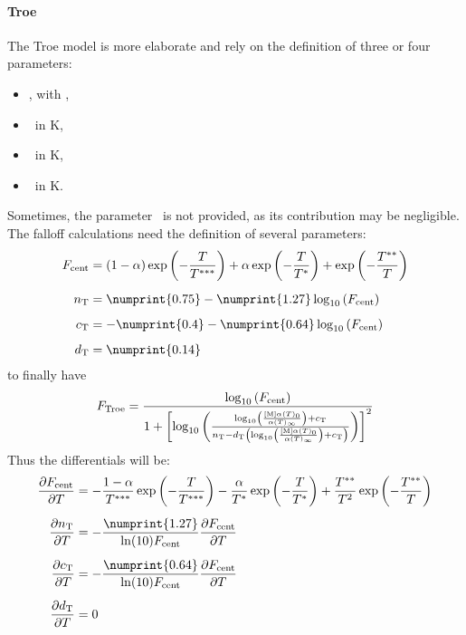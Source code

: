 \paragraph{Troe}
The Troe model is more elaborate and rely on the definition of three or
four parameters:
\begin{itemize}
\item \Troealpha, with \nounit,
\item \TroeTone\ in \unit{K},
\item \TroeTtwo\ in \unit{K},
\item \TroeTthree\ in \unit{K}.
\end{itemize}
Sometimes, the parameter \TroeTtwo\ is not provided, as its contribution
may be negligible.
The falloff calculations need the definition of several parameters:
\begin{equation}
\begin{split}
\TroeFcent & = \left(1 - \Troealpha\right)\exp\left(-\frac{\Temp}{\TroeTthree}\right)
              +          \Troealpha       \exp\left(-\frac{\Temp}{\TroeTone}\right)
              +                           \exp\left(-\frac{\TroeTtwo}{\Temp}\right) \\[5pt]
\Troen     & =   \numprint{0.75} - \numprint{1.27}\log_{10}\left(\TroeFcent\right)  \\[5pt]
\Troec     & = - \numprint{0.4}  - \numprint{0.64}\log_{10}\left(\TroeFcent\right)  \\[5pt]
\Troed     & =   \numprint{0.14}
\end{split}
\label{Troe:parameter}
\end{equation}
to finally have
\newcommand{\pr}{\ensuremath{\log_{10}\left(\frac{\conc[M]\kinMod_0}{\kinMod_\infty}\right)}}
\begin{equation}
\FTroe = \frac{\log_{10}\left(\TroeFcent\right)}
              {1 + \left[
                        \log_{10}\left(
                                        \frac{\pr + \Troec}
                                             {\Troen - \Troed\left(
                                                                \pr + \Troec
                                                            \right)}
                                 \right) 
                   \right]^2}
\label{Troe:F}
\end{equation}
Thus the differentials will be:
\begin{equation}
\begin{split}
\doverdT{\TroeFcent} & = - \frac{1 - \Troealpha}{\TroeTthree}\exp\left(-\frac{\Temp}{\TroeTthree}\right)
                         - \frac{\Troealpha}{\TroeTone}\exp\left(-\frac{\Temp}{\TroeTone}\right)
                         + \frac{\TroeTtwo}{\Temp^2}\exp\left(-\frac{\TroeTtwo}{\Temp}\right)\\[5pt]
\doverdT{\Troen}     & = - \frac{\numprint{1.27}}{\ln(10)\TroeFcent}\doverdT{\TroeFcent} \\[5pt]
\doverdT{\Troec}     & = - \frac{\numprint{0.64}}{\ln(10)\TroeFcent}\doverdT{\TroeFcent} \\[5pt]
\doverdT{\Troed}     & = 0
\end{split}
\label{Troe:dparameterdT}
\end{equation}
